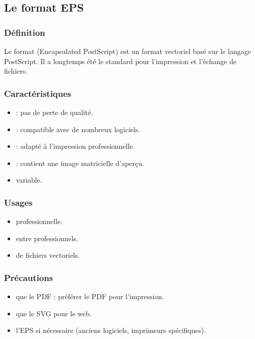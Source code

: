 \subsection{Le format EPS}

\subsubsection{Définition}

Le format  (Encapsulated PostScript) est un format vectoriel basé sur le langage PostScript. Il a longtemps été le standard pour l'impression et l'échange de fichiers.

\subsubsection{Caractéristiques}

\begin{itemize}
    \item {} : pas de perte de qualité.
    \item {} : compatible avec de nombreux logiciels.
    \item {} : adapté à l'impression professionnelle.
    \item {} : contient une image matricielle d'aperçu.
    \item {} variable.
\end{itemize}

\subsubsection{Usages}

\begin{itemize}
    \item {} professionnelle.
    \item {} entre professionnels.
    \item {} de fichiers vectoriels.
\end{itemize}

\subsubsection{Précautions}

\begin{itemize}
    \item {} que le PDF : préférer le PDF pour l'impression.
    \item {} que le SVG pour le web.
    \item {} l'EPS si nécessaire (anciens logiciels, imprimeurs spécifiques).
\end{itemize}

